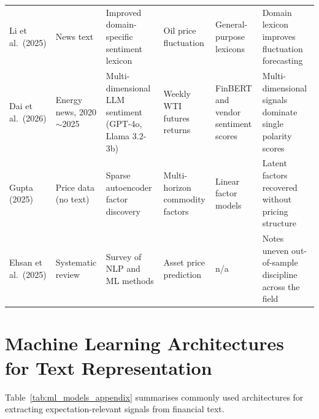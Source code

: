 \documentclass[journal]{IEEEtran}
\newcommand{\rng}{\ensuremath{\sim}}
\begin{document}
\begin{table}[H]
\begin{tabular}{p{2.6cm} p{2.6cm} p{3.0cm} p{2.6cm} p{2.4cm} p{2.6cm}}
Li et al.\ (2025) \cite{Li2025} & News text & Improved domain-specific sentiment lexicon & Oil price fluctuation & General-purpose lexicons & Domain lexicon improves fluctuation forecasting \\

Dai et al.\ (2026) \cite{Dai2026} & Energy news, 2020\rng{}2025 & Multi-dimensional LLM sentiment (GPT-4o, Llama 3.2-3b) & Weekly WTI futures returns & FinBERT and vendor sentiment scores & Multi-dimensional signals dominate single polarity scores \\

Gupta (2025) \cite{Gupta2025} & Price data (no text) & Sparse autoencoder factor discovery & Multi-horizon commodity factors & Linear factor models & Latent factors recovered without pricing structure \\

Ehsan et al.\ (2025) \cite{Ehsan2025} & Systematic review & Survey of NLP and ML methods & Asset price prediction & n/a & Notes uneven out-of-sample discipline across the field \\

\bottomrule
\end{tabular}
\end{table}

\section{Machine Learning Architectures for Text Representation}
\label{app:ml_models}

Table~\ref{tab:ml_models_appendix} summarises commonly used architectures for extracting expectation-relevant signals from financial text.

\vspace{0.5em}
\end{document}
